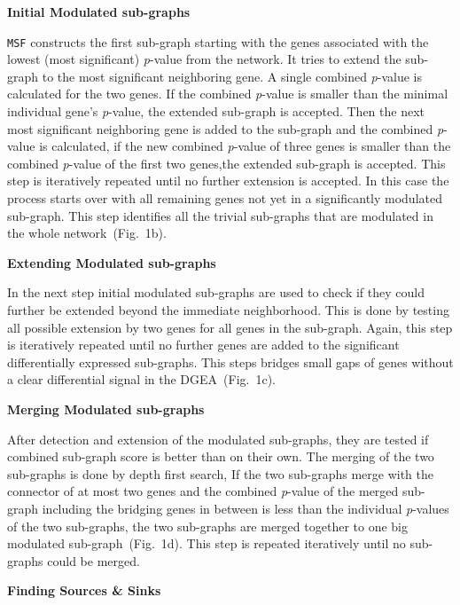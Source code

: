 \documentclass[twocolumn]{article}
\begin{document}
\textbf{Initial Modulated sub-graphs}

\texttt{MSF} constructs the first sub-graph starting with the genes
associated with the lowest (most significant) \textit{p}-value from
the network. It tries to extend the
sub-graph to the most significant neighboring gene. A single combined
\textit{p}-value is calculated for the two genes. If the combined
\textit{p}-value is smaller than the minimal individual gene's
\textit{p}-value, the extended sub-graph is accepted. Then the next most significant neighboring gene is added to the sub-graph and the combined \textit{p}-value is calculated, if the new combined \textit{p}-value of three genes is smaller than the combined \textit{p}-value of the first two genes,the extended sub-graph is accepted. This step is iteratively repeated until no further extension is accepted. In this case the process starts over with all remaining genes not yet in a
significantly modulated sub-graph. This step identifies all the trivial
sub-graphs that are modulated in the whole network~(Fig.~1b).\newline

\textbf{Extending Modulated sub-graphs}

In the next step initial modulated sub-graphs are used to check if
they could further be extended beyond the immediate neighborhood.
This is done by testing all possible extension by two genes for
all genes in the sub-graph. Again, this step is iteratively repeated until no
further genes are added to the significant differentially expressed
sub-graphs. This steps bridges small gaps of genes without a clear
differential signal in the DGEA~(Fig.~1c).\newline

\textbf{Merging Modulated sub-graphs}

After detection and extension of the modulated sub-graphs, they are
tested if combined sub-graph score is better than on their own. The merging of the two sub-graphs is done by depth first search, If the two sub-graphs merge with the connector of at most two genes and the
combined \textit{p}-value of the merged sub-graph including the
bridging genes in between is less than the individual
\textit{p}-values of the two sub-graphs, the two sub-graphs are merged
together to one big modulated sub-graph~(Fig.~1d). This step is repeated iteratively until no sub-graphs could be merged.\newline
 
\textbf{Finding Sources \& Sinks}
\end{document}
